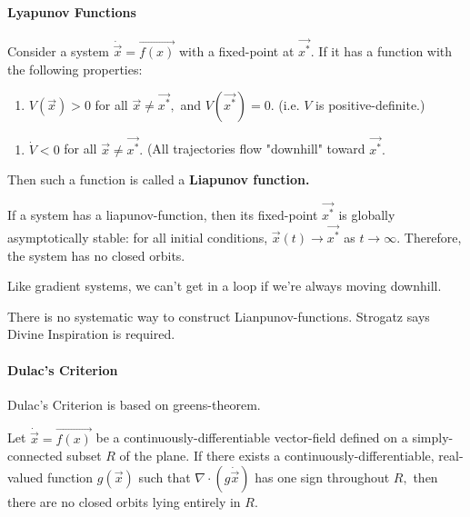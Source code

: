 \documentclass{article}
\begin{document}
\paragraph{Lyapunov Functions}

\begin{definition}
Consider a system $\dot{\vec{x}} = \vec{f(x)}$ with a \@{fixed-point} at $\vec{x^*}.$ If it has a function with the following properties:

\begin{enumerate}
\item $V(\vec{x}) > 0$ for all $\vec{x} \neq \vec{x^*},$ and $V(\vec{x^*}) = 0.$ (i.e. $V$ is \@{positive-definite}.)
\end{enumerate}

\begin{enumerate}
\item $\dot{V} < 0$ for all $\vec{x} \neq \vec{x^*}.$ (All trajectories flow "downhill" toward $\vec{x^*}.$
\end{enumerate}

Then such a function is called a \textbf{Liapunov function.}
\end{definition}

\begin{theorem}
If a system has a \@{liapunov-function}, then its \@{fixed-point} $\vec{x^*}$ is globally asymptotically stable: for all initial conditions, $\vec{x}(t) \to \vec{x^*}$ as $t \to \infty.$ Therefore, the system has no closed orbits.
\end{theorem}

\begin{intuition}
Like gradient systems, we can't get in a loop if we're always moving downhill.
\end{intuition}

There is no systematic way to construct \@{Lianpunov-functions}. Strogatz says Divine Inspiration is required.

\paragraph{Dulac's Criterion}

Dulac's Criterion is based on \@{greens-theorem}.

\begin{theorem}
Let $\dot{\vec{x}} = \vec{f(x)}$ be a \@{continuously-differentiable} \@{vector-field} defined on a \@{simply-connected} \@{subset} $R$ of the \@{plane}. If there exists a \@{continuously-differentiable}, \@{real-valued} \@{function} $g(\vec{x})$ such that $\nabla \cdot (g\dot{\vec{x}})$ has one sign throughout $R,$ then there are no \@{closed} \@{orbits} lying entirely in $R.$
\end{theorem}
\end{document}
